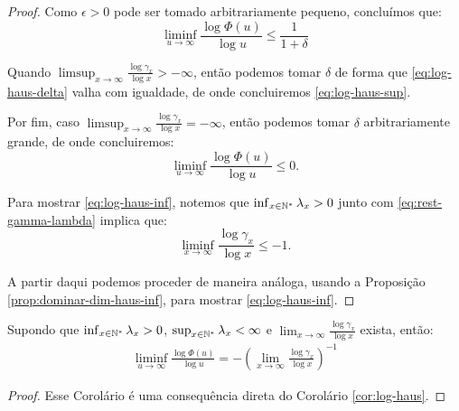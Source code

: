 \begin{proof}
  Como $\epsilon > 0$ pode ser tomado arbitrariamente pequeno,
  concluímos que:
  \begin{displaymath}
    \liminf_{u \to \infty} \frac{\log \Phi(u)}{\log u} \leq
    \frac{1}{1+\delta} 
  \end{displaymath}
  
  Quando $\limsup_{x\to\infty} \frac{\log \gamma_x}{\log x} >
  -\infty$, então podemos tomar $\delta$ de forma que
  \eqref{eq:log-haus-delta} valha com igualdade, de onde concluiremos
  \eqref{eq:log-haus-sup}.

  Por fim, caso $\limsup_{x\to\infty} \frac{\log \gamma_x}{\log x} =
  -\infty$, então podemos tomar $\delta$ arbitrariamente grande, de
  onde concluiremos:
  \begin{displaymath}
    \liminf_{u \to \infty} \frac{\log \Phi(u)}{\log u} \leq 0.
  \end{displaymath}

  Para mostrar \eqref{eq:log-haus-inf}, notemos que 
  $\inf_{x \in {\mathbb{N^*}}} \lambda_x > 0$ junto com
  \eqref{eq:rest-gamma-lambda} implica que:
  \begin{displaymath}
    \liminf_{x\to\infty}\frac{\log \gamma_x}{\log x} \leq -1.
  \end{displaymath}

  A partir daqui podemos proceder de maneira análoga, usando a
  Proposição \ref{prop:dominar-dim-haus-inf}, para mostrar
  \eqref{eq:log-haus-inf}.
\end{proof}

\begin{corolario}
  \label{cor:log-haus-igual}
   Supondo que $\inf_{x \in {\mathbb{N^*}}} \lambda_x > 0$, $\sup_{x \in {\mathbb{N^*}}}
  \lambda_x < \infty$ e $\lim_{x\to\infty} \frac{\log \gamma_x}{\log
    x}$ exista, então:
  \begin{gather}
    \label{eq:log-haus-igual}
    \liminf_{u \to \infty} \frac{\log \Phi(u)}{\log u} =
    - \left( \lim_{x \to \infty} \frac{\log \gamma_x}{\log x}
    \right)^{-1}
  \end{gather}
\end{corolario}
\begin{proof}
  Esse Corolário é uma consequência direta do Corolário
  \ref{cor:log-haus}.
\end{proof}

